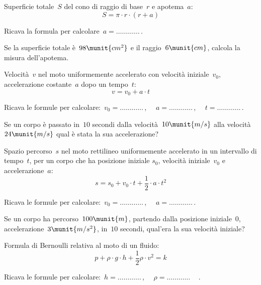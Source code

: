\begin{esercizio}
\label{ese:20.60}
Superficie totale~\(S\) del cono di raggio di base~\(r\) e apotema~\(a\):
\begin{equation*}
  S=\pi \cdot r\cdot (r+a)
\end{equation*}

Ricava la formula per calcolare~\(a=\ldots\ldots\ldots\ldots\)\,.

Se la superficie totale è~\(98\munit{cm^2}\) e il raggio~\(6\munit{cm}\), 
calcola 
la misura dell'apotema.
\end{esercizio}

\begin{esercizio}
\label{ese:20.61}
Velocità~\(v\) nel moto uniformemente accelerato con velocità 
iniziale~\(v_0\), 
accelerazione costante~\(a\) dopo un tempo~\(t\):
\begin{equation*}
  v=v_{0}+a\cdot t
\end{equation*}

Ricava le formule per calcolare:~\(v_0=\ldots\ldots\ldots\ldots\)\,, \(\quad 
a=\ldots\ldots\ldots\ldots\)\,, \(\quad t =\ldots\ldots\ldots\ldots\)\,.

Se un corpo è passato in~\(10\) secondi dalla velocità~\(10\munit{m/s}\) alla 
velocità~\(24\munit{m/s}\) qual è stata la sua accelerazione?
\end{esercizio}

\begin{esercizio}
\label{ese:20.62}
Spazio percorso~\(s\) nel moto rettilineo uniformemente accelerato in un 
intervallo di tempo~\(t\), per un corpo che ha posizione iniziale
\(s_0\), velocità iniziale~\(v_0\) e accelerazione~\(a\):
\begin{equation*}
  s=s_{0}+v_{0}\cdot t+\dfrac{1}{2}\cdot a\cdot t^{2}
\end{equation*}

Ricava le formule per calcolare:~\(v_0=\ldots\ldots\ldots\ldots\)\,, \(\quad 
a=\ldots\ldots\ldots\ldots\)\,.

Se un corpo ha percorso~\(100\munit{m}\), partendo dalla posizione 
iniziale~\(0\), 
accelerazione~\(3\munit{m/s^2}\), in~\(10\) secondi, qual'era la sua velocità 
iniziale?
\end{esercizio}

\begin{esercizio}
\label{ese:20.63}
Formula di Bernoulli relativa al moto di un fluido:
\begin{equation*}
  p+\rho \cdot g\cdot h+\dfrac{1}{2}\rho \cdot v^{2}=k
\end{equation*}

Ricava le formule per calcolare:~\(h=\ldots\ldots\ldots\ldots\)\,, \(\quad 
\rho=\ldots\ldots\ldots\ldots\quad\)\,.
\end{esercizio}

